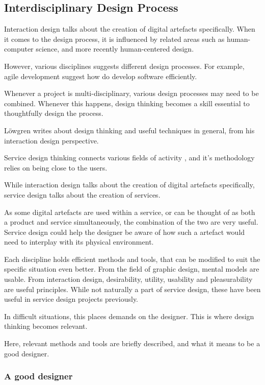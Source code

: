 \subsection{Interdisciplinary Design Process}

%

Interaction design talks about the creation of digital artefacts specifically. When it comes to the design process, it is influenced by related areas such as human-computer science, and more recently human-centered design.

However, various disciplines suggests different design processes. For example, agile development suggest how do develop software efficiently.

Whenever a project is multi-disciplinary, various design processes may need to be combined. Whenever this happens, design thinking becomes a skill essential to thoughtfully design the process.

Löwgren \cite{lowgren} writes about design thinking and useful techniques in general, from his interaction design perspective.

Service design thinking connects various fields of activity \cite{stickdorn}, and it's methodology relies on being close to the users.

While interaction design talks about the creation of digital artefacts specifically, service design talks about the creation of services.

As some digital artefacts are used within a service, or can be thought of as both a product and service simultaneously, the combination of the two are very useful. Service design could help the designer be aware of how such a artefact would need to interplay with its physical environment.

Each discipline holds efficient methods and tools, that can be modified to suit the specific situation even better. From the field of graphic design, mental models are usable. From interaction design, desirability, utility, usability and pleasurability are useful principles. While not naturally a part of service design, these have been useful in service design projects previously. \cite{stickdorn}

In difficult situations, this places demands on the designer. This is where design thinking becomes relevant.

Here, relevant methods and tools are briefly described, and what it means to be a good designer.

\subsubsection{A good designer}

